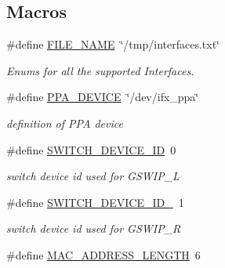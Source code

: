 \subsection*{Macros}
\begin{DoxyCompactItemize}
\item 
\#define \hyperlink{group__FAPI__SYSTEM_gab117546549783a058d0321a287699579}{F\-I\-L\-E\-\_\-\-N\-A\-M\-E}~\char`\"{}/tmp/interfaces.\-txt\char`\"{}
\begin{DoxyCompactList}\small\item\em Enums for all the supported Interfaces. \end{DoxyCompactList}\item 
\hypertarget{group__FAPI__SYSTEM_ga6f01e96912acf8bb989cff277c7206ef}{\#define \hyperlink{group__FAPI__SYSTEM_ga6f01e96912acf8bb989cff277c7206ef}{P\-P\-A\-\_\-\-D\-E\-V\-I\-C\-E}~\char`\"{}/dev/ifx\-\_\-ppa\char`\"{}}\label{group__FAPI__SYSTEM_ga6f01e96912acf8bb989cff277c7206ef}

\begin{DoxyCompactList}\small\item\em definition of P\-P\-A device \end{DoxyCompactList}\item 
\hypertarget{group__FAPI__SYSTEM_ga863cd4e25772d345cf0297097f9edae4}{\#define \hyperlink{group__FAPI__SYSTEM_ga863cd4e25772d345cf0297097f9edae4}{S\-W\-I\-T\-C\-H\-\_\-\-D\-E\-V\-I\-C\-E\-\_\-\-I\-D}~0}\label{group__FAPI__SYSTEM_ga863cd4e25772d345cf0297097f9edae4}

\begin{DoxyCompactList}\small\item\em switch device id used for G\-S\-W\-I\-P\-\_\-\-L \end{DoxyCompactList}\item 
\hypertarget{group__FAPI__SYSTEM_gac76470452d615866c51c0dcd57b58295}{\#define \hyperlink{group__FAPI__SYSTEM_gac76470452d615866c51c0dcd57b58295}{S\-W\-I\-T\-C\-H\-\_\-\-D\-E\-V\-I\-C\-E\-\_\-\-I\-D\-\_}~1}\label{group__FAPI__SYSTEM_gac76470452d615866c51c0dcd57b58295}

\begin{DoxyCompactList}\small\item\em switch device id used for G\-S\-W\-I\-P\-\_\-\-R \end{DoxyCompactList}\item 
\hypertarget{group__FAPI__SYSTEM_ga6775c61c8966a6b25a059e805cd0c010}{\#define \hyperlink{group__FAPI__SYSTEM_ga6775c61c8966a6b25a059e805cd0c010}{M\-A\-C\-\_\-\-A\-D\-D\-R\-E\-S\-S\-\_\-\-L\-E\-N\-G\-T\-H}~6}\label{group__FAPI__SYSTEM_ga6775c61c8966a6b25a059e805cd0c010}


\end{DoxyCompactItemize}
